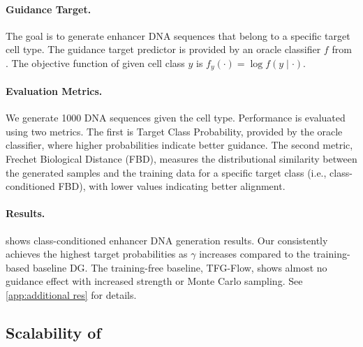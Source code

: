 \paragraph{Guidance Target.} The goal is to generate enhancer DNA sequences that belong to a specific target cell type. The guidance target predictor is provided by an oracle classifier $f$ from \citet{stark2024dirichlet}. The objective function of given cell class $y$ is $f_y(\cdot) = \log  f(y\mid \cdot)$. 


\vspace{-5pt}
\paragraph{Evaluation Metrics.} We generate 1000 DNA sequences given the cell type. Performance is evaluated using two metrics. The first is Target Class Probability, provided by the oracle classifier, where higher probabilities indicate better guidance. The second metric, Frechet Biological Distance (FBD), measures the distributional similarity between the generated samples and the training data for a specific target class (i.e., class-conditioned FBD), with lower values indicating better alignment.





\paragraph{Results.}  shows class-conditioned enhancer DNA generation results. 
Our  \xtgrad consistently achieves the highest target probabilities as $\gamma$ increases compared to the training-based baseline DG. 
The training-free baseline, TFG-Flow, shows almost no guidance effect with increased strength or Monte Carlo sampling. See \cref{app:additional res} for details.


    







\subsection{Scalability of \ouralg} \label{sec: exp scalabiliity}




